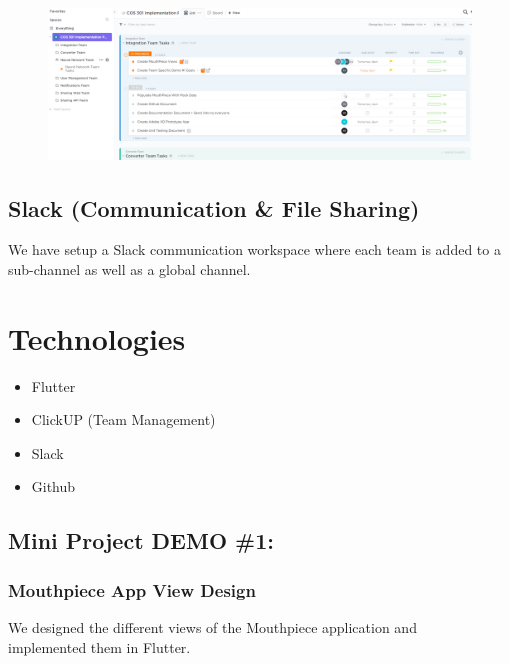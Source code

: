 \documentclass{article}
\begin{document}
\begin{figure}[h]
    \centering
    \includegraphics[width=\textwidth]{clickup.png}
\end{figure}

\subsection{Slack (Communication \& File Sharing)}
We have setup a Slack communication workspace where each team is added to a sub-channel as well as a global channel. 

\section{Technologies}
\begin{itemize}
    \item Flutter
    \item ClickUP (Team Management)
    \item Slack
    \item Github
\end{itemize}

\subsection{Mini Project DEMO \#1:}
\subsubsection{Mouthpiece App View Design}
We designed the different views of the Mouthpiece application and \\ implemented them in Flutter.
\end{document}
